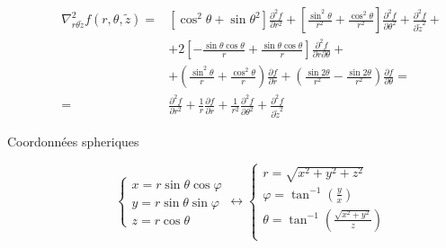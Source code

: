 \documentclass
[
a4paper,                      %
twoside,					  %
12pt,                         %
abstract,		      %
fleqn,                        %
]
{scrartcl} %
\begin{document}
\begin{description}
\begin{equation}
\begin{aligned}
\nabla_{r\theta\tilde{z}}^{2}f\left(r,\theta,\tilde{z}\right)=&\left[\cos^{2}{\theta}+\sin{\theta}^{2}\right]\frac{\partial^{2} f}{\partial r^{2}}+\left[\frac{\sin^{2}{\theta}}{r^{2}}+\frac{\cos^{2}{\theta}}{r^{2}}\right]\frac{\partial^{2} f}{\partial\theta^{2}}+\frac{\partial^{2} f}{\partial\tilde{z}^{2}}+\\[5pt]
&+2\left[-\frac{\sin{\theta}\cos{\theta}}{r}+\frac{\sin{\theta}\cos{\theta}}{r}\right]\frac{\partial^{2} f}{\partial r\partial\theta}+\\[5pt]
&+\left(\frac{\sin^{2}{\theta}}{r}+\frac{\cos^{2}{\theta}}{r}\right)\frac{\partial f}{\partial r}+\left(\frac{\sin{2\theta}}{r^{2}}-\frac{\sin{2\theta}}{r^{2}}\right)\frac{\partial f}{\partial\theta}=\\[5pt]
=&\frac{\partial^{2} f}{\partial r^{2}}+\frac{1}{r}\frac{\partial f}{\partial r}+\frac{1}{r^{2}}\frac{\partial^{2} f}{\partial\theta^{2}}+\frac{\partial^{2} f}{\partial\tilde{z}^{2}}
\end{aligned}
\end{equation}

\newpage

\item[Coordonn\'ees spheriques]

\begin{equation}
\begin{cases}
x=r\sin{\theta}\cos{\varphi}\\
y=r\sin{\theta}\sin{\varphi}\\
z=r\cos{\theta}
\end{cases}\longleftrightarrow\begin{cases}
r=\sqrt{x^{2}+y^{2}+z^{2}}\\
\varphi=\tan^{-1}\left(\frac{y}{x}\right)\\
\theta=\tan^{-1}\left(\frac{\sqrt{x^{2}+y^{2}}}{z}\right)\\
\end{cases}
\end{equation}


\end{description}
\end{document}
